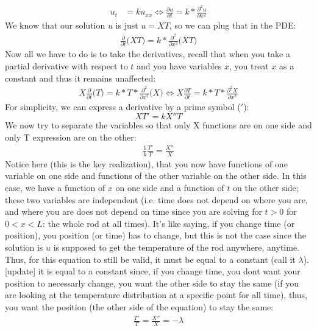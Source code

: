 \documentclass[11pt]{article}
\begin{document}
\begin{align}
	u_{t} &= ku_{xx} \Longleftrightarrow \frac{\partial u}{\partial t} = k*\frac{\partial^{2} u}{\partial x^2}
\end{align}
We know that our solution $u$ is just $u=XT$, so we can plug that in the PDE:
\begin{align}
	\frac{\partial}{\partial t}\big(XT\big) = k*\frac{\partial^{2} }{\partial x^2}\big(XT\big)
\end{align}
Now all we have to do is to take the derivatives, recall that when you take a partial derivative with respect to $t$ and you have variables $x$, you treat $x$ as a constant and thus it remains unaffected:
\begin{align}
	X\frac{\partial}{\partial t}\big(T\big) = k*T*\frac{\partial^{2} }{\partial x^2}\big(X\big) \Longleftrightarrow X\frac{\partial T}{\partial t} = k*T*\frac{\partial^{2}X }{\partial x^2}
\end{align}
For simplicity, we can express a derivative by a prime symbol ($'$):
\begin{equation}
	XT'=kX''T
\end{equation}
We now try to separate the variables so that only X functions are on one side and only T expression are on the other:
\begin{align}
	\frac{1}{k}\frac{T'}{T}=\frac{X''}{X}
\end{align}
Notice here (this is the key realization), that you now have functions of one variable on one side and functions of the other variable on the other side. In this case, we have a function of $x$ on one side and a function of $t$ on the other side; these two variables are independent (i.e. time does not depend on where you are, and where you are does not depend on time since you are solving for $t>0$ for $0<x<L$: the whole rod at all times). It's like saying, if you change time (or position), you position (or time) has to change, but this is not the case since the solution is $u$ is supposed to get the temperature of the rod anywhere, anytime. Thus, for this equation to still be valid, it must be equal to a constant (call it $\lambda$). [update] it is equal to a constant since, if you change time, you dont want your position to necessarly change, you want the other side to stay the same (if you are looking at the temperature distribution at a specific point for all time), thus, you want the position (the other side of the equation) to stay the same:
\begin{align}
	\frac{T'}{T}=\frac{X''}{X}=-\lambda
\end{align}
\end{document}
